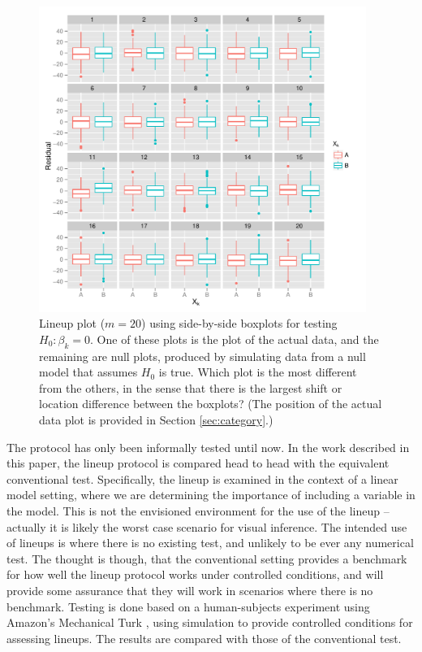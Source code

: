 \documentclass[12pt]{article}
\begin{document}
\begin{figure}[htp]
   \centering
       \includegraphics[width=0.95\textwidth]{lineup_category.pdf}
       \caption{Lineup plot ($m=20$) using side-by-side boxplots for testing $H_0: \beta_k=0$. One of these plots is the plot of the actual data, and the remaining are null plots, produced by simulating data from a null model that assumes $H_0$ is true. Which plot is the most different from the others, in the sense that there is the largest shift or location difference between the boxplots? (The position of the actual data plot is provided in Section \ref{sec:category}.)}
       \label{fig:test_category}
\end{figure}

The protocol has only been informally tested until now. In the work described in this paper, the lineup protocol is compared head to head with the equivalent conventional test. Specifically, the lineup is examined in the context of a linear model setting, where we are determining the importance of including a variable in the model. This is not the envisioned environment for the use of the lineup -- actually it is likely the worst case scenario for visual inference. The intended use of lineups is where there is no existing test, and unlikely to be ever any numerical test. The thought is though, that the conventional setting provides a benchmark for how well the lineup protocol works under controlled conditions, and will provide some assurance that they will work in scenarios where there is no benchmark. Testing is done based on a human-subjects experiment using Amazon's Mechanical Turk \citep{turk}, using simulation to provide controlled conditions for assessing lineups. The results are compared with those of the conventional test. 
\end{document}
